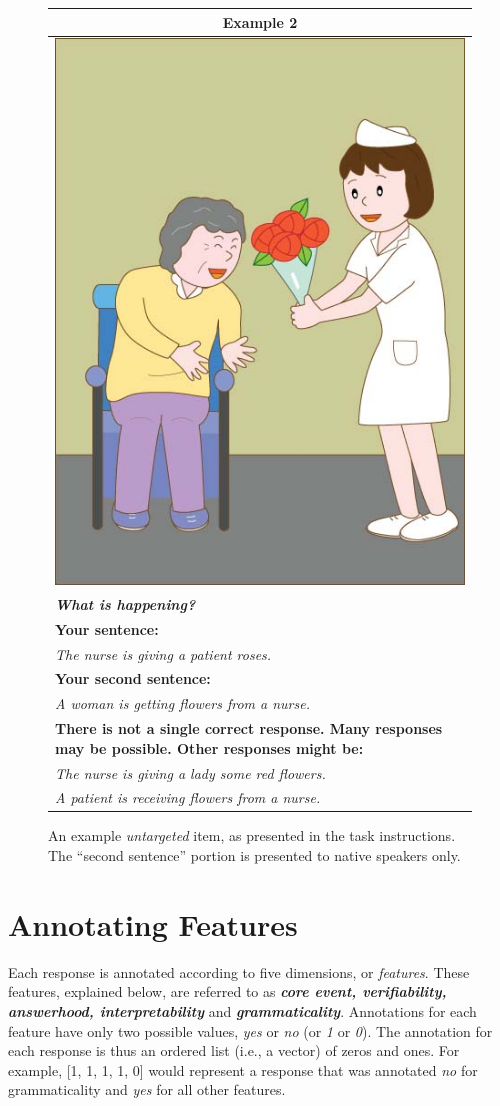 \documentclass[12pt]{article}
\begin{document}
\begin{figure}[!htb]
\begin{center}
\begin{tabular}{|p{}|}
\hline
\multicolumn{1}{|c|}{\textbf{Example 2}}\\
\hline
\multicolumn{1}{|c|}{\includegraphics[width=0.4\columnwidth,trim=0 0 0 -3]{figures/ex01.jpg}}\\
\hline
\textbf{\textit{What is happening?}}\\
\hline
\textbf{Your sentence:} \\
\textit{The nurse is giving a patient roses.}\\
\hline
\textbf{Your second sentence:} \\
\textit{A woman is getting flowers from a nurse.} \\
\hline
\textbf{There is not a single correct response. Many responses may be possible. Other responses might be:} \\
\textit{The nurse is giving a lady some red flowers.} \\
\textit{A patient is receiving flowers from a nurse.} \\
\hline
\end{tabular}
\end{center}
\caption{An example \textit{untargeted} item, as presented in the task instructions. The ``second sentence'' portion is presented to native speakers only.}
\label{fig:instructions2}
\end{figure}

\clearpage
\section{Annotating Features}

Each response is annotated according to five dimensions, or \textit{features}. These features, explained below, are referred to as \textit{\textbf{core event, verifiability, answerhood, interpretability}} and \textit{\textbf{grammaticality}}. Annotations for each feature have only two possible values, \textit{yes} or \textit{no} (or \textit{1} or \textit{0}). The annotation for each response is thus an ordered list (i.e., a vector) of zeros and ones. For example, [1, 1, 1, 1, 0] would represent a response that was annotated \textit{no} for grammaticality and \textit{yes} for all other features.
\end{document}
